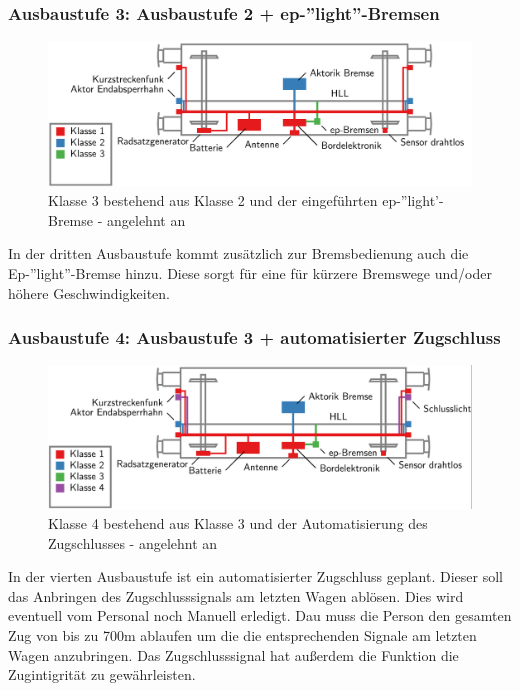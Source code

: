 \subsubsection{Ausbaustufe 3: Ausbaustufe 2 + ep-''light''-Bremsen}
\begin{figure}[htbp] 
    \includegraphics[width=\textwidth]{Bilder/Ausbaustufen_3.PNG}
    \caption{Klasse 3 bestehend aus Klasse 2 und der eingeführten ep-''light'-Bremse - angelehnt an \cite{ETR_3}}
    \label{fig:Klasse3}
\end{figure} 
In der dritten Ausbaustufe kommt zusätzlich zur Bremsbedienung auch die Ep-''light''-Bremse hinzu. Diese sorgt für eine für kürzere Bremswege und/oder höhere Geschwindigkeiten.\par
\subsubsection{Ausbaustufe 4: Ausbaustufe 3 + automatisierter Zugschluss}
\begin{figure}[htbp] 
    \includegraphics[width=\textwidth]{Bilder/Ausbaustufen_4.PNG}
    \caption{Klasse 4 bestehend aus Klasse 3 und der Automatisierung des Zugschlusses - angelehnt an \cite{ETR_3}}
    \label{fig:Klasse4}
\end{figure} 
In der vierten Ausbaustufe ist ein automatisierter Zugschluss geplant. Dieser soll das Anbringen des Zugschlusssignals am letzten Wagen ablösen. Dies wird eventuell vom Personal noch Manuell erledigt. Dau muss die Person den gesamten Zug von bis zu 700m ablaufen um die die entsprechenden Signale am letzten Wagen anzubringen. Das Zugschlusssignal hat außerdem die Funktion die Zugintigrität zu gewährleisten. 
